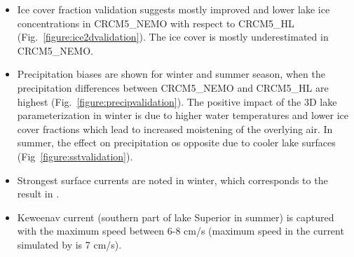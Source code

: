 \documentclass[a0b,landscape]{a0poster}
\begin{document}
\begin{multicols*}{4}
\begin{itemize}
  \item Ice cover fraction validation suggests mostly improved and lower lake ice concentrations in CRCM5\_NEMO with respect to CRCM5\_HL (Fig.~\ref{figure:ice2dvalidation}).
  The ice cover is mostly underestimated in CRCM5\_NEMO.
  \item Precipitation biases are shown for winter and summer season, when the precipitation differences between CRCM5\_NEMO and CRCM5\_HL are highest (Fig.~\ref{figure:precipvalidation}).
  The positive impact of the 3D lake parameterization in winter is due to higher water temperatures and lower ice cover fractions which lead to increased moistening of the overlying air.
  In summer, the effect on precipitation os opposite due to cooler lake surfaces (Fig~\ref{figure:sstvalidation}).
\end{itemize}




\noindent
{}
\begin{itemize}
  \item Strongest surface currents are noted in winter, which corresponds to the result in \citet{dupont2012}.
  \item Keweenav current (southern part of lake Superior in summer) is captured with the maximum speed
  between 6-8 cm/s (maximum speed in the current simulated by \citet{dupont2012} is 7 cm/s).
\end{itemize}



\end{multicols*}
\end{document}
